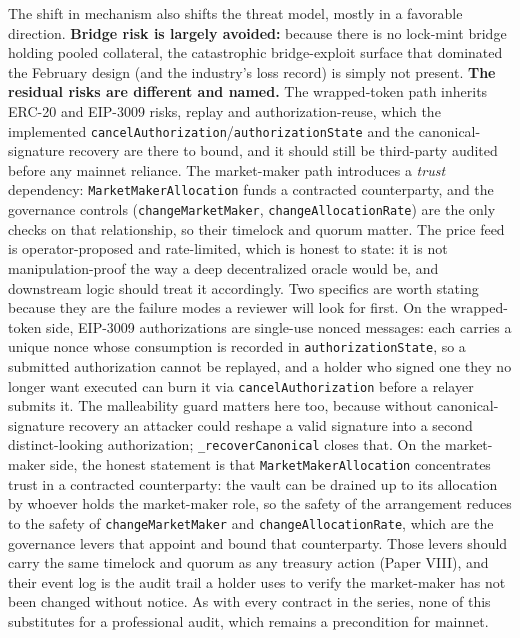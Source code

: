 The shift in mechanism also shifts the threat model, mostly in a
favorable direction. \textbf{Bridge risk is largely avoided:} because
there is no lock-mint bridge holding pooled collateral, the catastrophic
bridge-exploit surface that dominated the February design (and the
industry's loss record) is simply not present. \textbf{The residual
risks are different and named.} The wrapped-token path inherits ERC-20
and EIP-3009 risks, replay and authorization-reuse, which the
implemented \texttt{cancelAuthorization}/\texttt{authorizationState} and
the canonical-signature recovery are there to bound, and it should still
be third-party audited before any mainnet reliance. The market-maker
path introduces a \emph{trust} dependency:
\texttt{MarketMakerAllocation} funds a contracted counterparty, and the
governance controls (\texttt{changeMarketMaker},
\texttt{changeAllocationRate}) are the only checks on that relationship,
so their timelock and quorum matter. The price feed is operator-proposed
and rate-limited, which is honest to state: it is not manipulation-proof
the way a deep decentralized oracle would be, and downstream logic
should treat it accordingly. Two specifics are worth stating because
they are the failure modes a reviewer will look for first. On the
wrapped-token side, EIP-3009 authorizations are single-use nonced
messages: each carries a unique nonce whose consumption is recorded in
\texttt{authorizationState}, so a submitted authorization cannot be
replayed, and a holder who signed one they no longer want executed can
burn it via \texttt{cancelAuthorization} before a relayer submits it.
The malleability guard matters here too, because without
canonical-signature recovery an attacker could reshape a valid signature
into a second distinct-looking authorization;
\texttt{\_recoverCanonical} closes that. On the market-maker side, the
honest statement is that \texttt{MarketMakerAllocation} concentrates
trust in a contracted counterparty: the vault can be drained up to its
allocation by whoever holds the market-maker role, so the safety of the
arrangement reduces to the safety of \texttt{changeMarketMaker} and
\texttt{changeAllocationRate}, which are the governance levers that
appoint and bound that counterparty. Those levers should carry the same
timelock and quorum as any treasury action (Paper VIII), and their event
log is the audit trail a holder uses to verify the market-maker has not
been changed without notice. As with every contract in the series, none
of this substitutes for a professional audit, which remains a
precondition for mainnet.

